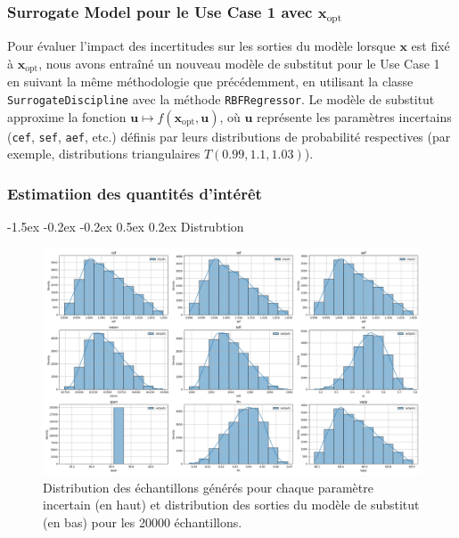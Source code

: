 \documentclass[a4paper, 11pt]{article}
\makeatletter
\newcounter{subsubsubsection}[subsubsection]
\newcommand\subsubsubsection{\@startsection{subsubsubsection}{4}{\z@}%
    {-1.5ex \@plus -0.2ex \@minus -0.2ex}%
    {0.5ex \@plus 0.2ex}%
    {\normalfont\normalsize\bfseries}}%
\makeatother
\begin{document}
\subsubsection{Surrogate Model pour le Use Case 1 avec \( \mathbf{x}_{\text{opt}} \)}

Pour évaluer l'impact des incertitudes sur les sorties du modèle lorsque \( \mathbf{x} \) est fixé à \( \mathbf{x}_{\text{opt}} \), nous avons entraîné un nouveau modèle de substitut pour le Use Case 1 en suivant la même méthodologie que précédemment, en utilisant la classe \texttt{SurrogateDiscipline} avec la méthode \texttt{RBFRegressor}. Le modèle de substitut approxime la fonction \( \mathbf{u} \mapsto f(\mathbf{x}_{\text{opt}}, \mathbf{u}) \), où \( \mathbf{u} \) représente les paramètres incertains (\texttt{cef}, \texttt{sef}, \texttt{aef}, etc.) définis par leurs distributions de probabilité respectives (par exemple, distributions triangulaires \( T(0.99, 1.1, 1.03) \)).


\subsubsection{Estimatiion des quantités d'intérêt}

\subsubsubsection{Distrubtion}
\begin{figure}[H]
    \centering
    \includegraphics[width=0.9\linewidth]{Images_Ayoub/Problem2/X_opt/Estimating_Quantities/Input_Output_Distributions/image.png}
    \caption{Distribution des échantillons générés pour chaque paramètre incertain (en haut) et distribution des sorties du modèle de substitut (en bas) pour les 20000 échantillons.}
    \label{fig:enter-label}
\end{figure}
\end{document}
